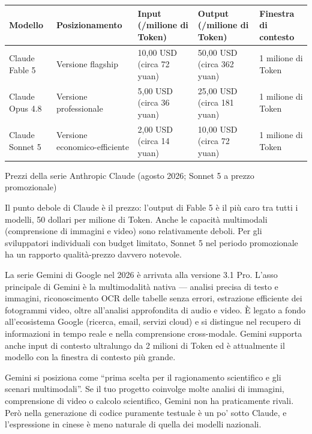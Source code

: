 \begin{center}
\begin{tabularx}{\linewidth}{|X|X|X|X|X|}
\hline
\textbf{Modello} & \textbf{Posizionamento} & \textbf{Input (/milione di Token)} & \textbf{Output (/milione di Token)} & \textbf{Finestra di contesto} \tabularnewline
\hline
Claude Fable 5 & Versione flagship & 10,00 USD (circa 72 yuan) & 50,00 USD (circa 362 yuan) & 1 milione di Token \tabularnewline
Claude Opus 4.8 & Versione professionale & 5,00 USD (circa 36 yuan) & 25,00 USD (circa 181 yuan) & 1 milione di Token \tabularnewline
Claude Sonnet 5 & Versione economico-efficiente & 2,00 USD (circa 14 yuan) & 10,00 USD (circa 72 yuan) & 1 milione di Token \tabularnewline
\hline
\end{tabularx}
\end{center}

\begin{center}\small\color{gray}Prezzi della serie Anthropic Claude (agosto 2026; Sonnet 5 a prezzo promozionale)\end{center}

Il punto debole di Claude è il prezzo: l'output di Fable 5 è il più caro tra tutti i modelli, 50 dollari per milione di Token. Anche le capacità multimodali (comprensione di immagini e video) sono relativamente deboli. Per gli sviluppatori individuali con budget limitato, Sonnet 5 nel periodo promozionale ha un rapporto qualità-prezzo davvero notevole.


La serie Gemini di Google nel 2026 è arrivata alla versione 3.1 Pro. L'asso principale di Gemini è la multimodalità nativa — analisi precisa di testo e immagini, riconoscimento OCR delle tabelle senza errori, estrazione efficiente dei fotogrammi video, oltre all'analisi approfondita di audio e video. È legato a fondo all'ecosistema Google (ricerca, email, servizi cloud) e si distingue nel recupero di informazioni in tempo reale e nella comprensione cross-modale. Gemini supporta anche input di contesto ultralungo da 2 milioni di Token ed è attualmente il modello con la finestra di contesto più grande.

Gemini si posiziona come “prima scelta per il ragionamento scientifico e gli scenari multimodali”. Se il tuo progetto coinvolge molte analisi di immagini, comprensione di video o calcolo scientifico, Gemini non ha praticamente rivali. Però nella generazione di codice puramente testuale è un po' sotto Claude, e l'espressione in cinese è meno naturale di quella dei modelli nazionali.

